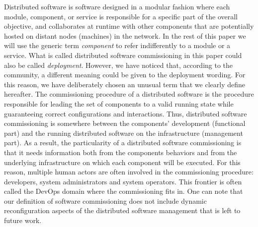 Distributed software is software designed in a modular fashion
where each module, component, or service is responsible for a
specific part of the overall objective, and collaborates at runtime
with other components that are potentially hosted on distant nodes
(\ie machines) in the network. In the rest of this paper we will
use the generic term \emph{component} to refer
indifferently to a module or a service.
%
What is called distributed software commissioning in this paper could
also be called \emph{deployment}. However, we have noticed that,
according to the community, a different meaning could be given to the
deployment wording. For this reason, we have deliberately chosen an
unusual term that we clearly define hereafter.
%
The commissioning procedure of a distributed software is the procedure
responsible for leading the set of components to a valid running state
while guaranteeing correct configurations and interactions. Thus,
distributed software commissioning is somewhere between the
components' development (functional part) and the running distributed
software on the infrastructure (management part). As a result, the
particularity of a distributed software commissioning is that it needs
information both from the components behaviors and from the underlying
infrastructure on which each component will be executed. For this
reason, multiple human actors are often involved in the commissioning
procedure: developers, system administrators and system
operators. This frontier is often called the DevOps domain where the
commissioning fits in. One can note that our definition of software
commissioning does not include dynamic reconfiguration aspects of the
distributed software management that is left to future work.

